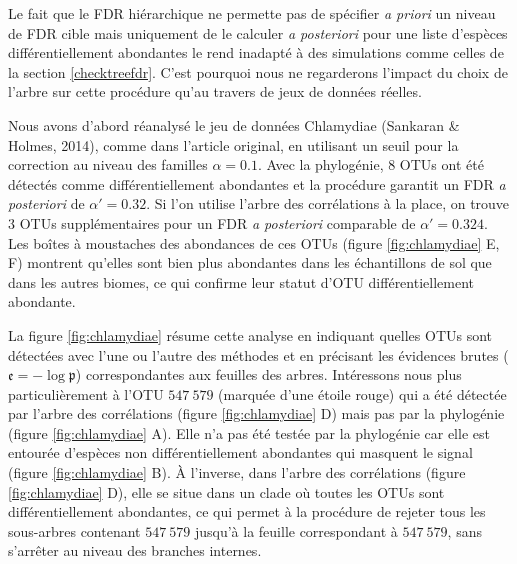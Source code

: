 \documentclass[12pt,a4paper]{reedthesis}
\newcommand \pv {\mathfrak{p}}
\theoremstyle{definition}
\theoremstyle{definition}
\theoremstyle{definition}
\theoremstyle{remark}
\begin{document}
Le fait que le FDR hiérarchique ne permette pas de spécifier \emph{a priori} un niveau de FDR cible mais uniquement de le calculer \emph{a posteriori} pour une liste d'espèces différentiellement abondantes le rend inadapté à des simulations comme celles de la section \ref{checktreefdr}. C'est pourquoi nous ne regarderons l'impact du choix de l'arbre sur cette procédure qu'au travers de jeux de données réelles.

Nous avons d'abord réanalysé le jeu de données Chlamydiae (Sankaran \& Holmes, 2014), comme dans l'article original, en utilisant un seuil pour la correction au niveau des familles \(\alpha = 0.1\). Avec la phylogénie, \(8\) OTUs ont été détectés comme différentiellement abondantes et la procédure garantit un FDR \emph{a posteriori} de \(\alpha'=0.32\). Si l'on utilise l'arbre des corrélations à la place, on trouve \(3\) OTUs supplémentaires pour un FDR \emph{a posteriori} comparable de \(\alpha'=0.324\). Les boîtes à moustaches des abondances de ces OTUs (figure \ref{fig:chlamydiae} E, F) montrent qu'elles sont bien plus abondantes dans les échantillons de sol que dans les autres biomes, ce qui confirme leur statut d'OTU différentiellement abondante.

La figure \ref{fig:chlamydiae} résume cette analyse en indiquant quelles OTUs sont détectées avec l'une ou l'autre des méthodes et en précisant les évidences brutes (\(\mathfrak{e} = -\log\pv\)) correspondantes aux feuilles des arbres. Intéressons nous plus particulièrement à l'OTU \(547~579\) (marquée d'une étoile rouge) qui a été détectée par l'arbre des corrélations (figure \ref{fig:chlamydiae} D) mais pas par la phylogénie (figure \ref{fig:chlamydiae} A). Elle n'a pas été testée par la phylogénie car elle est entourée d'espèces non différentiellement abondantes qui masquent le signal (figure \ref{fig:chlamydiae} B). À l'inverse, dans l'arbre des corrélations (figure \ref{fig:chlamydiae} D), elle se situe dans un clade où toutes les OTUs sont différentiellement abondantes, ce qui permet à la procédure de rejeter tous les sous-arbres contenant \(547~579\) jusqu'à la feuille correspondant à \(547~579\), sans s'arrêter au niveau des branches internes.
\end{document}
